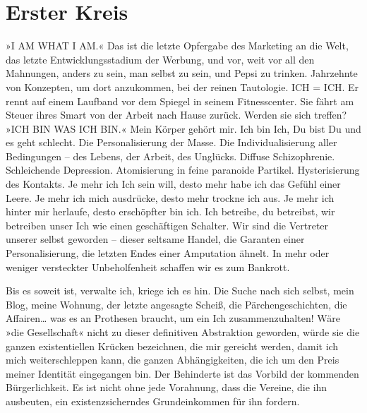 \section{Erster Kreis}


»I AM WHAT I AM.« Das ist die letzte Opfergabe des Marketing an die
Welt, das letzte Entwicklungsstadium der Werbung, und vor, weit vor
all den Mahnungen, anders zu sein, man selbst zu sein, und Pepsi zu
trinken. Jahrzehnte von Konzepten, um dort anzukommen, bei der
reinen Tautologie. ICH = ICH. Er rennt auf einem Laufband vor dem
Spiegel in seinem Fitnesscenter. Sie fährt am Steuer ihres Smart
von der Arbeit nach Hause zurück. Werden sie sich treffen?
»ICH BIN WAS ICH BIN.« Mein Körper gehört mir. Ich bin Ich, Du bist
Du und es geht schlecht. Die Personalisierung der Masse. Die
Individualisierung aller Bedingungen – des Lebens, der Arbeit, des
Unglücks. Diffuse Schizophrenie. Schleichende Depression.
Atomisierung in feine paranoide Partikel. Hysterisierung des
Kontakts. Je mehr ich Ich sein will, desto mehr habe ich das Gefühl
einer Leere. Je mehr ich mich ausdrücke, desto mehr trockne ich
aus. Je mehr ich hinter mir herlaufe, desto erschöpfter bin ich.
Ich betreibe, du betreibst, wir betreiben unser Ich wie einen
geschäftigen Schalter. Wir sind die Vertreter unserer selbst
geworden – dieser seltsame Handel, die Garanten einer
Personalisierung, die letzten Endes einer Amputation ähnelt. In
mehr oder weniger versteckter Unbeholfenheit schaffen wir es zum
Bankrott.

Bis es soweit ist, verwalte ich, kriege ich es hin. Die Suche nach
sich selbst, mein Blog, meine Wohnung, der letzte angesagte Scheiß,
die Pärchengeschichten, die Affairen\ldots{} was es an Prothesen
braucht, um ein Ich zusammenzuhalten! Wäre »die Gesellschaft« nicht
zu dieser definitiven Abstraktion geworden, würde sie die ganzen
existentiellen Krücken bezeichnen, die mir gereicht werden, damit
ich mich weiterschleppen kann, die ganzen Abhängigkeiten, die ich
um den Preis meiner Identität eingegangen bin. Der Behinderte ist
das Vorbild der kommenden Bürgerlichkeit. Es ist nicht ohne jede
Vorahnung, dass die Vereine, die ihn ausbeuten, ein
existenzsicherndes Grundeinkommen für ihn fordern.

\extrapar{}

